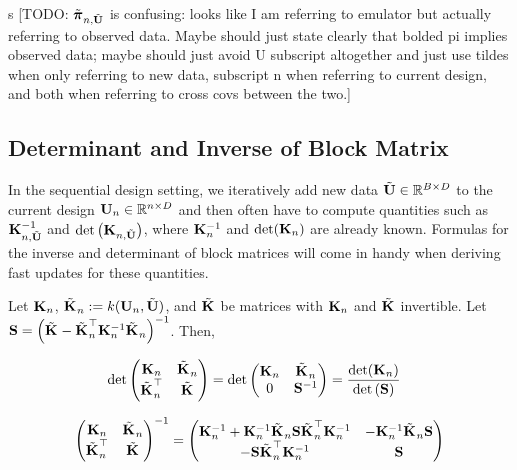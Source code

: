 \documentclass[12pt]{article}
\begin{document}
s
[TODO: $\tilde{\boldsymbol{\postDens}}_{\designIdx, \batchMat}$ is confusing: looks like I am referring to emulator but actually referring to observed data. Maybe 
should just state clearly that bolded pi implies observed data; maybe should just avoid U subscript altogether and just use tildes when only referring to 
new data, subscript n when referring to current design, and both when referring to cross covs between the two.]


\subsection{Determinant and Inverse of Block Matrix}
In the sequential design setting, we iteratively add new data $\batchMat \in \R^{\Nbatch \times \Npar}$ to the current design 
$\designMat \in \R^{\designIdx \times \Npar}$ and then often have to compute quantities such as 
$\KerMat[\designIdx, \batchMat]^{-1}$ and $\det\left(\KerMat[\designIdx, \batchMat]\right)$, where $\KerMat^{-1}$ and $\det(\KerMat)$ are already known. 
Formulas for the inverse and determinant of block matrices will come in handy 
when deriving fast updates for these quantities. 

Let $\KerMat$, $\tilde{\KerMat[]}_{\designIdx} := \GPKer(\designMat, \batchMat)$, and $\tilde{\KerMat[]}$ be matrices with $\KerMat$ and 
$\tilde{\KerMat[]}$ invertible. Let  $\mathbf{S} = \left(\tilde{\KerMat[]} - \tilde{\KerMat[]}_{\designIdx}^\top \KerMat^{-1} \tilde{\KerMat[]}_{\designIdx} \right)^{-1}$. Then,
 
\begin{align}
&\det\begin{pmatrix} \KerMat & \tilde{\KerMat[]}_{\designIdx}  \\ \tilde{\KerMat[]}_{\designIdx} ^\top & \tilde{\KerMat[]} \end{pmatrix} 
= \det \begin{pmatrix} \KerMat & \tilde{\KerMat[]}_{\designIdx} \\ 0 & \mathbf{S}^{-1}   \end{pmatrix} 
= \frac{\det(\KerMat)}{\det\left(\mathbf{S}\right)} \label{block_determinant}
\end{align}

\begin{align}
\begin{pmatrix} \KerMat & \tilde{\KerMat[]}_{\designIdx}  \\ \tilde{\KerMat[]}_{\designIdx}^\top & \tilde{\KerMat[]} \end{pmatrix}^{-1} 
= \begin{pmatrix} \KerMat^{-1} + \KerMat^{-1}\tilde{\KerMat[]}_{\designIdx}\mathbf{S} \tilde{\KerMat[]}_{\designIdx}^\top \KerMat^{-1} & -\KerMat^{-1}\tilde{\KerMat[]}_{\designIdx} \mathbf{S}  \\
-\mathbf{S} \tilde{\KerMat[]}_{\designIdx}^\top \KerMat^{-1} & \mathbf{S}  \end{pmatrix} \label{block_inverse}
\end{align}
\end{document}
